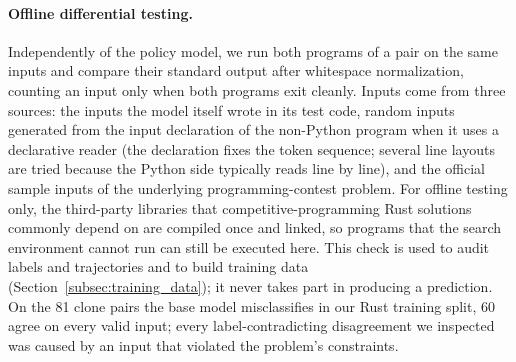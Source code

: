 %


\paragraph{Offline differential testing.} Independently of the policy model,
we run both programs of a pair on the same inputs and compare their standard
output after whitespace normalization, counting an input only when both
programs exit cleanly. Inputs come from three sources: the inputs the model
itself wrote in its test code, random inputs generated from the input
declaration of the non-Python program when it uses a declarative reader (the
declaration fixes the token sequence; several line layouts are tried because
the Python side typically reads line by line), and the official sample
inputs of the underlying programming-contest problem. For offline testing
only, the third-party libraries that competitive-programming Rust solutions
commonly depend on are compiled once and linked, so programs that the search
environment cannot run can still be executed here. This check is used to
audit labels and trajectories and to build training data
(Section~\ref{subsec:training_data}); it never takes part in producing a
prediction. On the 81 clone pairs the base model misclassifies in our Rust
training split, 60 agree on every valid input; every label-contradicting
disagreement we inspected was caused by an input that violated the problem's
constraints.

